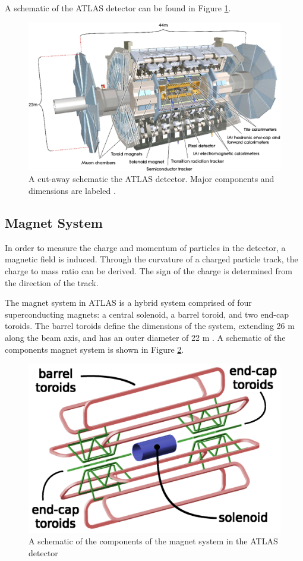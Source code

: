 A schematic of the ATLAS detector can be found in Figure \ref{fig:atlas}.

\begin{figure}[!ht]
    \centering
    \includegraphics[width=.7\textwidth]{chapters/chapter2_experiment/images/atlas_detector.png}
    \caption{A cut-away schematic the ATLAS detector. Major components and dimensions are labeled \cite{atlas-experiment}.}
    \label{fig:atlas}
\end{figure}

\subsection{Magnet System} \label{ssec:magnetsystem}
In order to measure the charge and momentum of particles in the detector, a magnetic field is induced. Through the curvature of a charged particle track, the charge to mass ratio can be derived. The sign of the charge is determined from the direction of the track.

The magnet system in ATLAS is a hybrid system comprised of four superconducting magnets: a central solenoid, a barrel toroid, and two end-cap toroids. The barrel toroids define the dimensions of the system, extending 26 m along the beam axis, and has an outer diameter of 22 m
\cite{magnet-system-tdr}. A schematic of the components magnet system is shown in Figure \ref{fig:magnetSystem}.

\begin{figure}[!ht]
    \centering
    \includegraphics[width=.8\textwidth]{chapters/chapter2_experiment/images/magnetSystems.png}
    \caption{A schematic of the components of the magnet system in the ATLAS detector \cite{magnet-schematic}}
    \label{fig:magnetSystem}
\end{figure}

